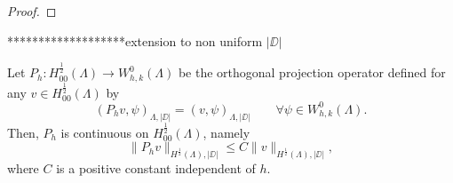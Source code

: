 \begin{proof}

\end{proof}


{\color{red}
*******************extension to non uniform $|\DD|$
}
\begin{lemma}
Let $P_h: H^{\frac 12}_{00}(\Lambda) \longrightarrow W_{h,k}^0(\Lambda)$ be the orthogonal projection operator defined  for any $v \in H^{\frac 12}_{00}(\Lambda)$ by
\begin{equation*}
(P_h v , \psi)_{\Lambda,|\DD|}= (v, \psi)_{\Lambda , |\DD|} \qquad \forall \psi \in W_{h,k}^0(\Lambda).  
\end{equation*} 
Then, $P_h$ is continuous on $H^{\frac 12}_{00}(\Lambda)$, namely
\begin{equation*}
\|P_h v\|_{H^{\frac 12}(\Lambda),|\DD|} \leq C \|v\|_{H^{\frac 12}(\Lambda),|\DD|},
\end{equation*}
where $C$ is a positive constant independent of $h$.
\end{lemma}

